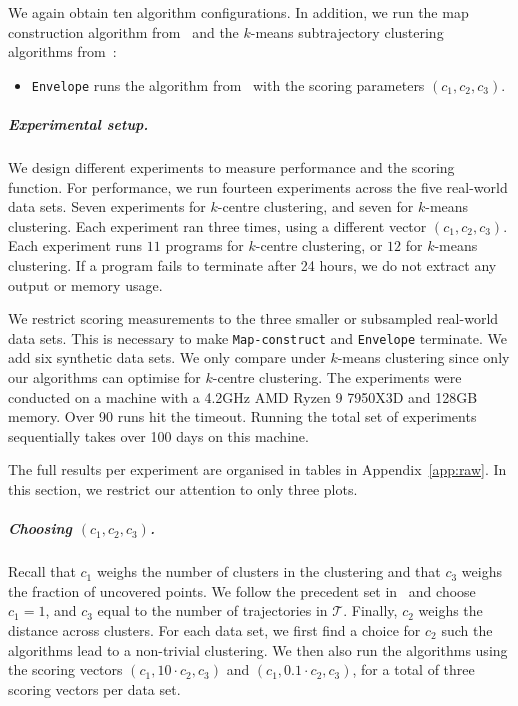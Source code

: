 \documentclass[english, thm-restate]{lipics-v2021}
\begin{document}
We again obtain ten algorithm configurations. In addition, we run the map construction algorithm from~\cite{buchin2020improved} and the $k$-means subtrajectory clustering algorithms from~\cite{agarwal2018subtrajectory}:

\begin{itemize}
    \item \texttt{Envelope} runs the algorithm from~\cite{agarwal2018subtrajectory} with the scoring parameters $(c_1, c_2, c_3)$. 
\end{itemize}





\subparagraph{Experimental setup.}
We design different experiments to measure performance and the scoring function.  For performance, we run fourteen experiments across the five real-world data sets.
Seven experiments for $k$-centre clustering, and seven for $k$-means clustering. 
Each experiment ran three times, using a different vector $(c_1, c_2, c_3)$. 
Each experiment runs $11$ programs for $k$-centre clustering, or $12$ for $k$-means clustering. If a program fails to terminate after 24 hours, we do not extract any output or memory usage. 

We restrict scoring measurements to the three smaller or subsampled real-world data sets. This is necessary to make \texttt{Map-construct} and \texttt{Envelope} terminate.  We add six synthetic data sets. We only compare under $k$-means clustering since only our algorithms can optimise for $k$-centre clustering.  
The experiments were conducted on a machine with a 4.2GHz AMD Ryzen 9 7950X3D and 128GB memory.
Over 90 runs hit the timeout. 
Running the total set of experiments sequentially takes over 100 days on this machine. 

The full results per experiment are organised in tables in Appendix~\ref{app:raw}.
In this section, we restrict our attention to only three plots. 


\subparagraph{Choosing $(c_1, c_2, c_3)$.}
Recall that $c_1$ weighs the number of clusters in the clustering and that $c_3$ weighs the fraction of uncovered points. 
We follow the precedent set in~\cite{agarwal2018subtrajectory} and choose $c_1 = 1$, and $c_3$ equal to the number of trajectories in $\mathcal{T}$. 
Finally, $c_2$ weighs the \frechet distance across clusters. 
For each data set, we first find a choice for $c_2$ such the algorithms lead to a non-trivial clustering. We then also run the algorithms using the scoring vectors $(c_1, 10 \cdot  c_2, c_3)$ and $(c_1, 0.1 \cdot  c_2, c_3)$, for a total of three scoring vectors per data set. 
\end{document}
